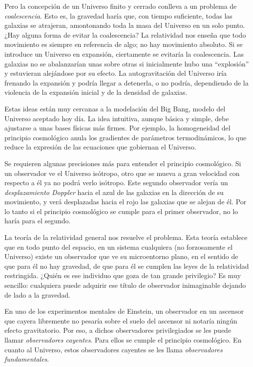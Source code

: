 \documentclass[a4paper,openright,12pt]{book}
\begin{document}
Pero la concepción de un Universo finito y cerrado conlleva a un problema de \textit{coalescencia}. Esto es, la gravedad haría que, con tiempo suficiente, todas las galaxias se atrajeran, amontonando toda la masa del Universo en un solo punto. ¿Hay alguna forma de evitar la coalescencia? La relatividad nos enseña que todo movimiento es siempre en referencia de algo; no hay movimiento absoluto. Si se introduce un Universo en expansión, ciertamente se evitaría la coalescencia. Las galaxias no se abalanzarían unas sobre otras si inicialmente hubo una ``explosión'' y estuvieran alejándose por su efecto. La autogravitación del Universo iría frenando la expansión y podría llegar a detenerla, o no podría, dependiendo de la violencia de la expansión inicial y de la densidad de galaxias.

Estas ideas están muy cercanas a la modelación del Big Bang, modelo del Universo aceptado hoy día. La idea intuitiva, aunque básica y simple, debe ajustarse a unas bases físicas más firmes. Por ejemplo, la homogeneidad del principio cosmológico anula los gradientes de parámetros termodinámicos, lo que reduce la expresión de las ecuaciones que gobiernan el Universo.

Se requieren algunas precisiones más para entender el principio cosmológico. Si un observador ve el Universo isótropo, otro que se mueva a gran velocidad con respecto a él ya no podrá verlo isótropo. Este segundo observador vería un \textit{desplazamiento Doppler} hacia el azul de las galaxias en la dirección de su movimiento, y verá desplazadas hacia el rojo las galaxias que se alejan de él. Por lo tanto si el principio cosmológico se cumple para el primer observador, no lo haría para el segundo.

La teoría de la relatividad general nos resuelve el problema. Esta teoría establece que en todo punto del espacio, en un sistema cualquiera (no forzosamente el Universo) existe un observador que ve su microentorno plano, en el sentido de que para él no hay gravedad, de que para él se cumplen las leyes de la relatividad restringida. ¿Quién es ese individuo que goza de tan grande privilegio? Es muy sencillo: cualquiera puede adquirir ese título de observador inimaginable dejando de lado a la gravedad.

En uno de los experimentos mentales de Einstein, un observador en un ascensor que cayera libremente no pesaría sobre el suelo del ascensor ni notaría ningún efecto gravitatorio. Por eso, a dichos observadores privilegiados se les puede llamar \textit{observadores cayentes}. Para ellos se cumple el principio cosmológico. En cuanto al Universo, estos observadores cayentes se les llama \textit{observadores fundamentales}.
\end{document}
